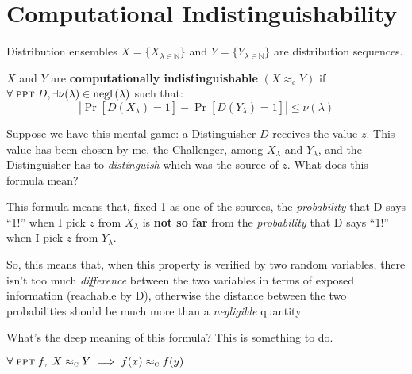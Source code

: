 \section{Computational Indistinguishability}

Distribution ensembles $X = \{X_{\lambda \in \mathbb{N}}\}$ and $Y = \{Y_{\lambda \in \mathbb{N}}\}$ are distribution sequences.

\begin{definition}
    $X$ and $Y$ are \textbf{computationally indistinguishable} $(X \approx_{c} Y)$ if $\forall\; \textsc{ppt}\; D, \exists \nu(\lambda) \in \mathrm{negl}\left({\lambda}\right)$ such that:
    \begin{equation*}
        \left| \Pr[D(X_\lambda) = 1] - \Pr[D(Y_\lambda) = 1] \right| \leq \nu(\lambda) 
    \end{equation*}
\end{definition}


Suppose we have this mental game: a Distinguisher $D$ receives the value $z$. This value has been chosen by me, the Challenger, among $X_{\lambda}$ and $Y_{\lambda}$, and the Distinguisher has to \textit{distinguish} which was the source of $z$. What does this formula mean?

This formula means that, fixed 1 as one of the sources, the \textit{probability} that D says ``1!'' when I pick $z$ from $X_{\lambda}$ is \textbf{not so far} from the \textit{probability} that D says ``1!'' when I pick $z$ from $Y_{\lambda}$.

So, this means that, when this property is verified by two random variables, there isn't too much \textit{difference} between the two variables in terms of exposed information (reachable by D), otherwise the distance between the two probabilities should be much more than a \textit{negligible} quantity.

What's the deep meaning of this formula? This is something to do.

\begin{lemma}\label{lem:tria}
    $\forall\; \textsc{ppt}\; f,\; X \approx_\textsc{c} Y \implies f(x) \approx_\textsc{c} f(y)$
\end{lemma}

